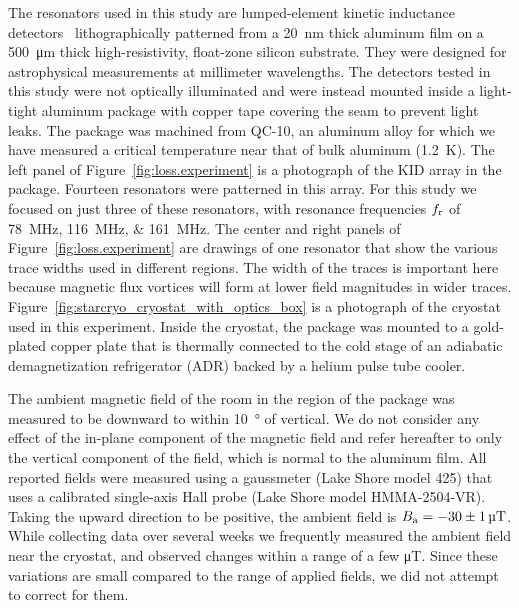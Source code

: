 The resonators used in this study are lumped-element kinetic inductance detectors~\autocite{Doyle2010SPIE} lithographically patterned from a \SI{20}{nm} thick aluminum film on a \SI{500}{\micro m} thick high-resistivity, float-zone silicon substrate.
They were designed for astrophysical measurements at millimeter wavelengths.
The detectors tested in this study were not optically illuminated and were instead mounted inside a light-tight aluminum package with copper tape covering the seam to prevent light leaks.
The package was machined from QC-10, an aluminum alloy for which we have measured a critical temperature near that of bulk aluminum (\SI{1.2}{K}).
The left panel of Figure~\ref{fig:loss.experiment} is a photograph of the KID array in the package.
Fourteen resonators were patterned in this array.
For this study we focused on just three of these resonators, with resonance frequencies $\freadout_\resonator$ of \SIlist{78;116;161}{MHz}.
The center and right panels of Figure~\ref{fig:loss.experiment} are drawings of one resonator that show the various trace widths used in different regions.
The width of the traces is important here because magnetic flux vortices will form at lower field magnitudes in wider traces.
Figure~\ref{fig:starcryo_cryostat_with_optics_box} is a photograph of the cryostat used in this experiment.
Inside the cryostat, the package was mounted to a gold-plated copper plate that is thermally connected to the cold stage of an adiabatic demagnetization refrigerator (ADR) backed by a helium pulse tube cooler.

The ambient magnetic field of the room in the region of the package was measured to be downward to within \SI{10}{\degree} of vertical.
We do not consider any effect of the in-plane component of the magnetic field and refer hereafter to only the vertical component of the field, which is normal to the aluminum film.
All reported fields were measured using a gaussmeter (Lake Shore model 425) that uses a calibrated single-axis Hall probe (Lake Shore model HMMA-2504-VR).
Taking the upward direction to be positive, the ambient field is $\bfield_\ambient = -30 \pm 1 \, \si{\micro T}$.
While collecting data over several weeks we frequently measured the ambient field near the cryostat, and observed changes within a range of a few \si{\micro T}.
Since these variations are small compared to the range of applied fields, we did not attempt to correct for them.

